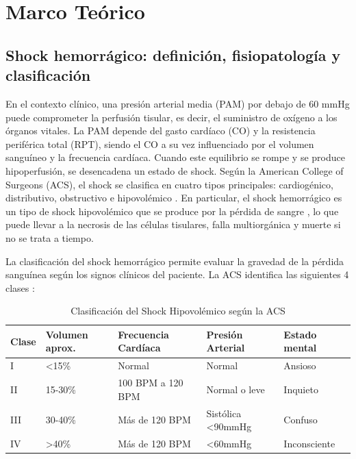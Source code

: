\section{Marco Teórico}

\subsection{Shock hemorrágico: definición, fisiopatología y clasificación}

En el contexto clínico, una presión arterial media (PAM) por debajo de 60 mmHg puede comprometer la perfusión tisular, es decir, el suministro de oxígeno a los órganos vitales. La PAM depende del gasto cardíaco (CO) y la resistencia periférica total (RPT), siendo el CO a su vez influenciado por el volumen sanguíneo y la frecuencia cardíaca. Cuando este equilibrio se rompe y se produce hipoperfusión, se desencadena un estado de shock. Según la American College of Surgeons (ACS), el shock se clasifica en cuatro tipos principales: cardiogénico, distributivo, obstructivo e hipovolémico \cite{hooper2022}. En particular, el shock hemorrágico es un tipo de shock hipovolémico que se produce por la pérdida de sangre \cite{cannon2018}, lo que puede llevar a la necrosis de las células tisulares, falla multiorgánica y muerte si no se trata a tiempo.

La clasificación del shock hemorrágico permite evaluar la gravedad de la pérdida sanguínea según los signos clínicos del paciente. La ACS identifica las siguientes 4 clases \cite{hooper2022}:

\begin{table}[H]
\centering
\caption{Clasificación del Shock Hipovolémico según la ACS}
\label{tab:clasificacion-shock}
\begin{tabular}{|l|l|l|l|l|}
\hline
\textbf{Clase} & \textbf{Volumen aprox.} & \textbf{Frecuencia Cardíaca} & \textbf{Presión Arterial} & \textbf{Estado mental} \\ \hline
I & <15\% & Normal & Normal & Ansioso \\ \hline
II & 15-30\% & 100 BPM a 120 BPM & Normal o leve & Inquieto \\ \hline
III & 30-40\% & Más de 120 BPM & Sistólica <90mmHg & Confuso \\ \hline
IV & >40\% & Más de 120 BPM & <60mmHg & Inconsciente \\ \hline
\end{tabular}
\end{table}

